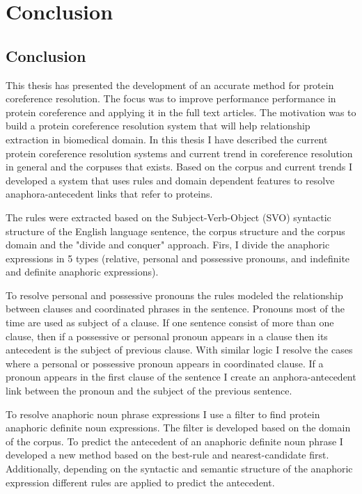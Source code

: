 \chapter{Conclusion}
\label{Conclusion}
\section{Conclusion}
This thesis has presented the development of an accurate method for protein coreference resolution. The focus was to  improve performance  performance in protein coreference  and applying it in the full text articles. The motivation was to build a protein coreference resolution system that will help relationship extraction in biomedical domain. In this thesis I have described the current protein coreference resolution systems  and current trend in coreference resolution in general and the corpuses that exists. Based on the corpus and current trends I developed a system that uses rules and domain dependent features to resolve anaphora-antecedent links that refer to proteins.   

 The rules were extracted based on the Subject-Verb-Object (SVO) syntactic structure of the English language sentence, the corpus structure and the corpus domain and the "divide and conquer" approach. Firs, I divide the anaphoric expressions in 5 types (relative, personal and possessive pronouns, and indefinite and definite anaphoric expressions).

To resolve personal and possessive pronouns the rules modeled the relationship between clauses and coordinated phrases in the sentence. Pronouns most of the time are used as subject of a clause. If one sentence consist of more than one clause, then if  a possessive or personal pronoun appears in a clause then its antecedent is the subject of previous clause. With similar logic I resolve the cases where a personal or possessive pronoun  appears in coordinated clause. If a pronoun appears in the first clause of the sentence I create an anphora-antecedent link between the pronoun and the subject of the previous sentence. 

To resolve anaphoric noun phrase expressions I use a filter to find protein anaphoric definite noun expressions. The filter is developed based on the domain of the corpus. To predict the antecedent of an anaphoric definite noun phrase I developed a new method based on the best-rule and nearest-candidate first. Additionally, depending on the syntactic and semantic structure of the anaphoric expression different rules are applied to predict the antecedent.

